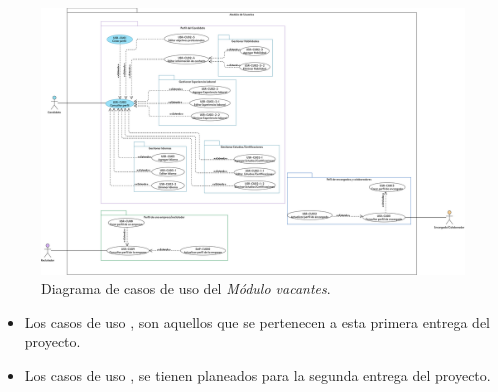 	\begin{figure}[hbtp!]
		\begin{center}
			\includegraphics[width=1 \textwidth]{anexos/imagenes/CUUSR.png}
		\end{center}
		
		\caption{Diagrama de casos de uso del \textit{Módulo vacantes}.}
		\label{adcu:usr}
	\end{figure}

	\begin{itemize}
        \item Los casos de uso \IUazul{} , son aquellos que se pertenecen a esta primera entrega del proyecto.
        \item Los casos de uso \IUblanco{}, se tienen planeados para la segunda entrega del proyecto.
    \end{itemize} 

	
	

	
	
